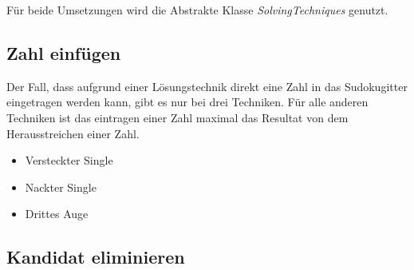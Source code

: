 Für beide Umsetzungen wird die Abstrakte Klasse \textit{SolvingTechniques} genutzt.

\subsection{Zahl einfügen}

Der Fall, dass aufgrund einer Lösungstechnik direkt eine Zahl in das Sudokugitter eingetragen werden kann, gibt es nur bei drei Techniken. Für alle anderen Techniken ist das eintragen einer Zahl maximal das Resultat von dem Herausstreichen einer Zahl. 
\begin{itemize}
	\item Versteckter Single
	\item Nackter Single
	\item Drittes Auge
\end{itemize}

\subsection{Kandidat eliminieren}
